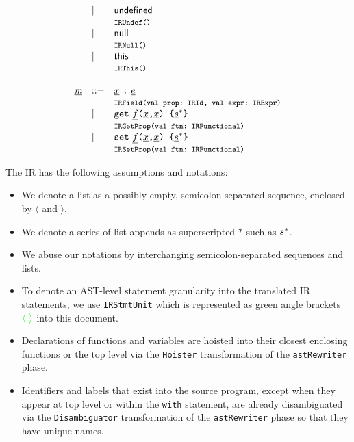 \[
\begin{array}{llll}
 &\mid& {\sf undefined} \\
&& \mtt{IRUndef()}\\
 &\mid& {\sf null} \\
&& \mtt{IRNull()}\\
 &\mid& {\sf this} \\
&& \mtt{IRThis()}\\\\

\ir\member &::=& \irid \ \verb+:+ \ \irexpr\\
&& \mtt{IRField(val prop:~IRId, val expr:~IRExpr)}\\
 &\mid& {\tt get}\ \ir{f} \verb+(+\irid\verb+,+\irid\verb+) {+ \ir\stmt^* \verb+}+\\
&&\mtt{IRGetProp(val ftn:~IRFunctional)}\\
 &\mid& {\tt set}\ \ir{f} \verb+(+\irid\verb+,+\irid\verb+) {+ \ir\stmt^* \verb+}+\\
&&\mtt{IRSetProp(val ftn:~IRFunctional)}\\
\end{array}
\]

The \safe IR has the following assumptions and notations:
\begin{itemize}
\item We denote a list as a possibly empty, semicolon-separated sequence, enclosed by $\langle$ and $\rangle$.
\item We denote a series of list appends as superscripted $*$ such as $s^*$.
\item We abuse our notations by interchanging semicolon-separated sequences and lists.
\item To denote an AST-level statement granularity into the translated IR statements,
we use {\tt IRStmtUnit} which is represented as green angle brackets {\ingreen ${\color{green}\langle}\ {\color{green}\rangle}$} into this document.
\item Declarations of functions and variables are hoisted into their closest enclosing functions
or the top level via the \verb!Hoister! transformation of the \verb!astRewriter! phase.
\item Identifiers and labels that exist into the source program,
except when they appear at top level or within the {\tt with} statement,
are already disambiguated via the \verb!Disambiguator! transformation of the \verb!astRewriter! phase
so that they have unique names.
\end{itemize}
